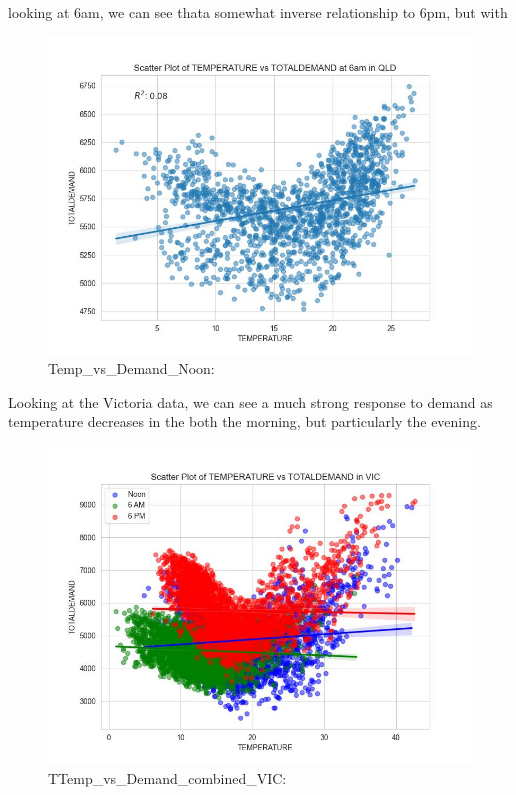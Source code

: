\documentclass[
]{article}
\begin{document}
looking at 6am, we can see thata somewhat inverse relationship to 6pm,
but with

\begin{figure}
\centering
\includegraphics{img/Temp_vs_Demand_6am.jpg}
\caption{Temp\_vs\_Demand\_Noon:}
\end{figure}

Looking at the Victoria data, we can see a much strong response to
demand as temperature decreases in the both the morning, but
particularly the evening.

\begin{figure}
\centering
\includegraphics{img/Temp_vs_Demand_combined_VIC.jpg}
\caption{TTemp\_vs\_Demand\_combined\_VIC:}
\end{figure}
\end{document}
